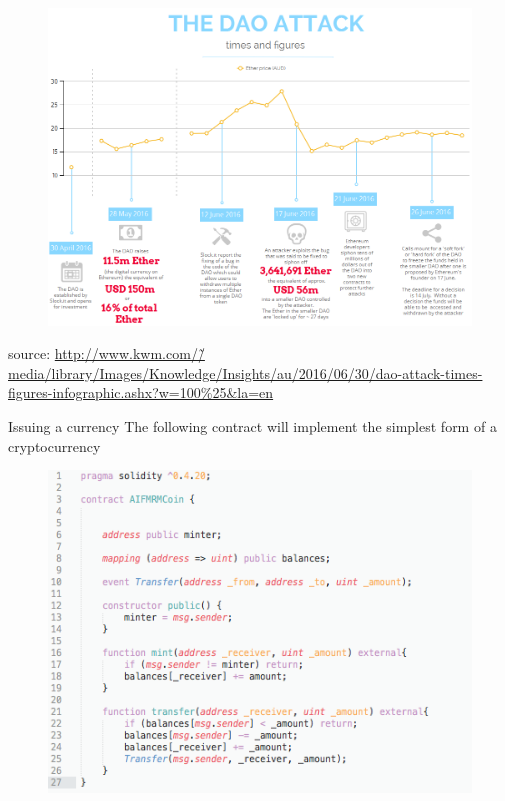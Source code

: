 \documentclass[11pt]{beamer}
\begin{document}
\begin{frame}{}
	\begin{figure}[]
		\centering
		\includegraphics  [scale=0.3]{Images/dao-attack}
	\end{figure}
	\begin{scriptsize}
		source: \href{http://www.kwm.com/en/knowledge/insights/smart-contracts-open-source-model-dna-digital-analogue-human-20160630}{http://www.kwm.com/\~/media/library/Images/Knowledge/Insights/au/2016/06/30/dao-attack-times-figures-infographic.ashx?w=100\%25\&la=en}
	\end{scriptsize}
\end{frame}


\begin{frame}{Issuing a currency}
	The following contract will implement the simplest form of a cryptocurrency
	\begin{figure}[]
		\centering
		\includegraphics  [scale=0.4]{Images/contract_new}
	\end{figure}
\end{frame}
\end{document}

